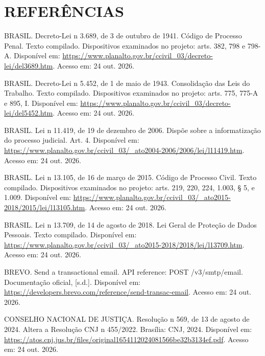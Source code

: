 \chapter*{REFERÊNCIAS}
\begin{singlespace}\setlength{\parindent}{0pt}\setlength{\parskip}{12pt}\raggedright
{}\label{ref:CPP}BRASIL. Decreto-Lei n\textordmasculine{} 3.689, de 3 de outubro de 1941. Código de Processo Penal. Texto compilado. Dispositivos examinados no projeto: arts. 382, 798 e 798-A. Disponível em: \url{https://www.planalto.gov.br/ccivil_03/decreto-lei/del3689.htm}. Acesso em: 24 out. 2026.\par
{}\label{ref:CLT}BRASIL. Decreto-Lei n\textordmasculine{} 5.452, de 1\textordmasculine{} de maio de 1943. Consolidação das Leis do Trabalho. Texto compilado. Dispositivos examinados no projeto: arts. 775, 775-A e 895, I. Disponível em: \url{https://www.planalto.gov.br/ccivil_03/decreto-lei/del5452.htm}. Acesso em: 24 out. 2026.\par
{}\label{ref:LEI11419}BRASIL. Lei n\textordmasculine{} 11.419, de 19 de dezembro de 2006. Dispõe sobre a informatização do processo judicial. Art. 4\textordmasculine{}. Disponível em: \url{https://www.planalto.gov.br/ccivil_03/_ato2004-2006/2006/lei/l11419.htm}. Acesso em: 24 out. 2026.\par
{}\label{ref:CPC}BRASIL. Lei n\textordmasculine{} 13.105, de 16 de março de 2015. Código de Processo Civil. Texto compilado. Dispositivos examinados no projeto: arts. 219, 220, 224, 1.003, \S{} 5\textordmasculine{}, e 1.009. Disponível em: \url{https://www.planalto.gov.br/ccivil_03/_ato2015-2018/2015/lei/l13105.htm}. Acesso em: 24 out. 2026.\par
{}\label{ref:LGPD}BRASIL. Lei n\textordmasculine{} 13.709, de 14 de agosto de 2018. Lei Geral de Proteção de Dados Pessoais. Texto compilado. Disponível em: \url{https://www.planalto.gov.br/ccivil_03/_ato2015-2018/2018/lei/l13709.htm}. Acesso em: 24 out. 2026.\par
{}\label{ref:BREVO}BREVO. Send a transactional email. API reference: POST /v3/smtp/email. Documentação oficial, [s.d.]. Disponível em: \url{https://developers.brevo.com/reference/send-transac-email}. Acesso em: 24 out. 2026.\par
{}\label{ref:CNJ569}CONSELHO NACIONAL DE JUSTIÇA. Resolução n\textordmasculine{} 569, de 13 de agosto de 2024. Altera a Resolução CNJ n\textordmasculine{} 455/2022. Brasília: CNJ, 2024. Disponível em: \url{https://atos.cnj.jus.br/files/original1654112024081566be32b3134ef.pdf}. Acesso em: 24 out. 2026.\par

\end{singlespace}
